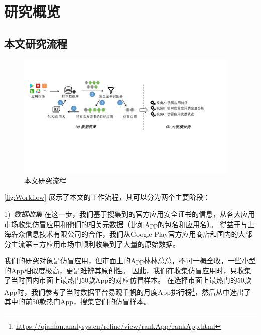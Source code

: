 \chapter{研究概览}
\label{chp:dataCollection}

\section{本文研究流程}

\begin{figure}[htbp]
	\centering
	\includegraphics[width=0.95\textwidth]{./Figures/overview_modified.pdf}
	\caption{本文研究流程}
	\label{fig:Workflow}
	\vspace{-3mm}
\end{figure}

\autoref{fig:Workflow} 展示了本文的工作流程，其可以分为两个主要阶段：

1)\ \emph{数据收集} \quad
在这一步，我们基于搜集到的官方应用安全证书的信息，从各大应用市场收集仿冒应用和他们的相关元数据（比如App的包名和应用名）。
得益于与上海犇众信息技术有限公司的合作，我们从Google Play官方应用商店和国内的大部分主流第三方应用市场中顺利收集到了大量的原始数据。

我们的研究对象是仿冒应用，但市面上的App林林总总，不可一概全收，一些小型的App相似度极高，更是难辨其原创性。
因此，我们在收集仿冒应用时，只收集了当时国内市面上最热门50款App的对应仿冒样本。
在选择市面上最热门的50款App时，我们参考了当时数据平台易观千帆的月度App排行榜\footnote{\url{https://qianfan.analysys.cn/refine/view/rankApp/rankApp.html}}，然后从中选出了其中的前50款热门App，搜集它们的仿冒样本。

